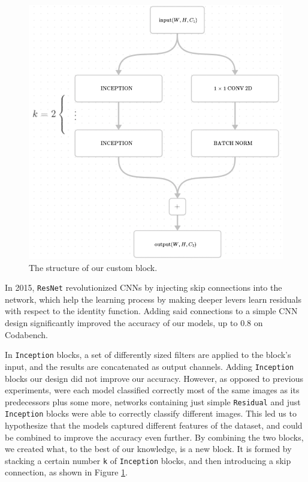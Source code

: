 \documentclass[11pt]{article}
\begin{document}
\begin{multicols}{2}
      \begin{figure}[H]
            \centering
            \includegraphics[width=0.75\linewidth]{custom_block.png}
            \caption{The structure of our custom block.}
            \label{fig:custom_block}
      \end{figure}

      In 2015, \texttt{ResNet} revolutionized CNNs by injecting skip connections into the network, which help the learning process by making deeper levers learn residuals with respect to the identity function. Adding said connections to a simple CNN design significantly improved the accuracy of our models, up to 0.8 on Codabench.

      In \texttt{Inception} blocks, a set of differently sized filters are applied to the block's input, and the results are concatenated as output channels. Adding \texttt{Inception} blocks our design did not improve our accuracy. However, as opposed to previous experiments, were each model classified correctly most of the same images as its predecessors plus some more, networks containing just simple \texttt{Residual} and just \texttt{Inception} blocks were able to correctly classify different images. This led us to hypothesize that the models captured different features of the dataset, and could be combined to improve the accuracy even further. By combining the two blocks, we created what, to the best of our knowledge, is a new block. It is formed by stacking a certain number \texttt{k} of \texttt{Inception} blocks, and then introducing a skip connection, as shown in Figure \ref{fig:custom_block}.


\end{multicols}
\end{document}

